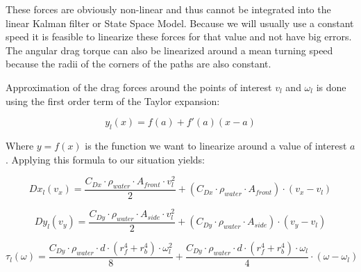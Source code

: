 These forces are obviously non-linear and thus cannot be integrated into the linear Kalman filter or State Space Model. Because we will usually use a constant speed it is feasible to linearize these forces for that value and not have big errors. The angular drag torque can also be linearized around a mean turning speed because the radii of the corners of the paths are also constant.

Approximation of the drag forces around the points of interest $v_{l} $ and $\omega_{l}$ is done using the first order term of the Taylor expansion:

\[ y_{l}(x) = f(a) + f'(a)(x-a) \]

Where $y = f(x)$ is the function we want to linearize around a value of interest $a$. Applying this formula to our situation yields:

\[ Dx_{l}(v_{x}) = \frac{C_{Dx}\cdot\rho_{water}\cdot A_{front}\cdot v_{l}^{2}}{2} + (C_{Dx}\cdot\rho_{water}\cdot A_{front})\cdot (v_{x}-v_{l}) \]

\[ Dy_{l}(v_{y}) = \frac{C_{Dy}\cdot\rho_{water}\cdot A_{side}\cdot v_{l}^{2}}{2} + (C_{Dy}\cdot\rho_{water}\cdot A_{side})\cdot (v_{y}-v_{l}) \]

\[ \tau_{l}(\omega) = \frac{C_{Dy} \cdot \rho_{water} \cdot d \cdot (r_{f}^{4} + r_{b}^{4}) \cdot \omega_{l}^{2}}{8} + \frac{C_{Dy} \cdot \rho_{water} \cdot d \cdot (r_{f}^{4} + r_{b}^{4}) \cdot \omega_{l}}{4} \cdot (\omega - \omega_{l}) \] 

